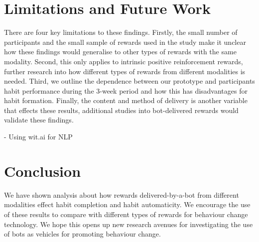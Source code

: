 
\newpage


\section{Limitations and Future Work}
There are four key limitations to these findings. Firstly, the small number of participants and the small sample of rewards used in the study make it unclear how these findings would generalise to other types of rewards with the same modality. Second, this only applies to intrinsic positive reinforcement rewards, further research into how different types of rewards from different modalities is needed. Third, we outline the dependence between our prototype and participants habit performance during the 3-week period and how this has disadvantages for habit formation. Finally, the content and method of delivery is another variable that effects these results, additional studies into bot-delivered rewards would validate these findings.

-  Using wit.ai for NLP


\section{Conclusion}
We have shown analysis about how rewards delivered-by-a-bot from different modalities effect habit completion and habit automaticity. We encourage the use of these results to compare with different types of rewards for behaviour change technology. We hope this opens up new research avenues for investigating the use of bots as vehicles for promoting behaviour change.


